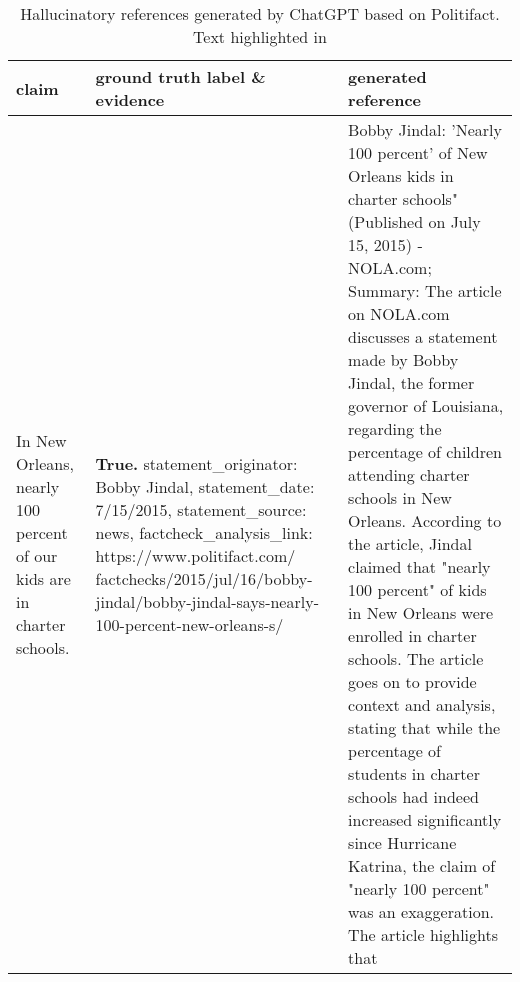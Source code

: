 \documentclass{article} %
\begin{document}
\begin{table}[htbp]
    \centering
    \begin{tabular}{p{3cm}p{5cm}p{5cm}}
    \toprule
    \textbf{claim } &  \textbf{ground truth label \& evidence} & \textbf{generated reference} \\
    \midrule
    In New Orleans, nearly 100 percent of our kids are in charter schools. & \textbf{True.} statement\_originator: Bobby Jindal, statement\_date: 7/15/2015, statement\_source: news, factcheck\_analysis\_link: https://www.politifact.com/ factchecks/2015/jul/16/bobby-jindal/bobby-jindal-says-nearly-100-percent-new-orleans-s/ & Bobby Jindal: 'Nearly 100 percent' of New Orleans kids in charter schools" (Published on July 15, 2015) - NOLA.com; Summary: The article on NOLA.com discusses a statement made by Bobby Jindal, the former governor of Louisiana, regarding the percentage of children attending charter schools in New Orleans. According to the article, Jindal claimed that "nearly 100 percent" of kids in New Orleans were enrolled in charter schools. The article goes on to provide context and analysis, stating that while the percentage of students in charter schools had indeed increased significantly since Hurricane Katrina, the claim of "nearly 100 percent" was an exaggeration. The article highlights that \color{red!75!black}{the actual percentage at the time was around 93 percent, which still represented a substantial majority but fell short of Jindal's claim.} \\
  \bottomrule
    \end{tabular}
    \caption{Hallucinatory references generated by ChatGPT based on Politifact. Text highlighted in \color{red!75!black}{red}\color{black}{ indicates hallucinatory content.} \\}
    \label{politics}
\end{table}
\end{document}
